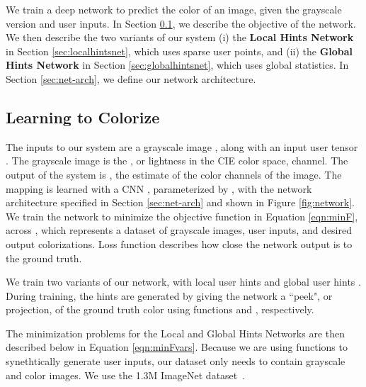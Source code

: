 \documentclass[acmtog,authorversion]{acmart}
\begin{document}
We train a deep network to predict the color of an image, given the grayscale version and user inputs. In Section \ref{sec:learncolor}, we describe the objective of the network. We then describe the two variants of our system (i) the \textbf{Local Hints Network} in Section \ref{sec:localhintsnet}, which uses sparse user points, and (ii) the \textbf{Global Hints Network} in Section \ref{sec:globalhintsnet}, which uses global statistics. In Section \ref{sec:net-arch}, we define our network architecture.

\subsection{Learning to Colorize}
\label{sec:learncolor}

The inputs to our system are a grayscale image , along with an input user tensor . The grayscale image is the , or lightness in the CIE  color space, channel. The output of the system is , the estimate of the  color channels of the image. The mapping is learned with a CNN , parameterized by , with the network architecture specified in Section \ref{sec:net-arch} and shown in Figure \ref{fig:network}. We train the network to minimize the objective function in Equation \ref{eqn:minF}, across , which represents a dataset of grayscale images, user inputs, and desired output colorizations. Loss function  describes how close the network output is to the ground truth.

\vspace{-3mm}

\vspace{-3mm}

We train two variants of our network, with local user hints  and global user hints . During training, the hints are generated by giving the network a ``peek", or projection, of the ground truth color  using functions  and , respectively.

\vspace{-3mm}

\vspace{-3mm}

The minimization problems for the Local and Global Hints Networks are then described below in Equation \ref{eqn:minFvars}. Because we are using functions  to synethtically generate user inputs, our dataset only needs to contain grayscale and color images. We use the 1.3M ImageNet dataset~\cite{russakovsky2015imagenet}.


\vspace{-4mm}
\end{document}
